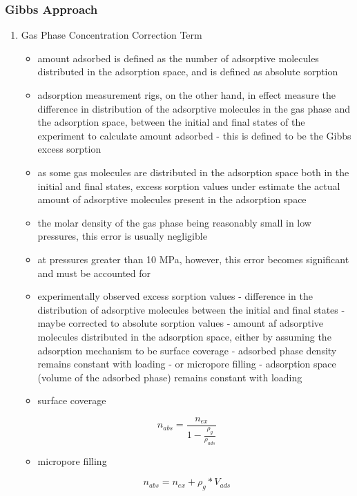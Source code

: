 \documentclass[11pt]{article}
\begin{document}
\subsubsection{Gibbs Approach}
\label{sec:orgd6c236c}
\begin{enumerate}
\item Gas Phase Concentration Correction Term
\label{sec:orgf85845e}
\begin{itemize}
\item amount adsorbed is defined as the number of adsorptive molecules distributed in the adsorption space, and is defined as absolute sorption
\item adsorption measurement rigs, on the other hand, in effect measure the difference in distribution of the adsorptive molecules in the gas phase and the adsorption space, between the initial and final states of the experiment to calculate amount adsorbed - this is defined to be the Gibbs excess sorption \cite{Brandani2017}
\item as some gas molecules are distributed in the adsorption space both in the initial and final states, excess sorption values under estimate the actual amount of adsorptive molecules present in the adsorption space
\item the molar density of the gas phase being reasonably small in low pressures, this error is usually negligible
\item at pressures greater than 10 MPa, however, this error becomes significant and must be accounted for
\item experimentally observed excess sorption values - difference in the distribution of adsorptive molecules between the initial and final states - maybe corrected to absolute sorption values - amount af adsorptive molecules distributed in the adsorption space, either by assuming the adsorption mechanism to be surface coverage - adsorbed phase density remains constant with loading - or micropore filling - adsorption space (volume of the adsorbed phase) remains constant with loading
\item surface coverage
\end{itemize}
\begin{equation}
n_{abs} = \frac{n_{ex}}{1-\frac{\rho_{g}}{\rho_{ads}}}
\end{equation}
\begin{itemize}
\item micropore filling
\end{itemize}
\begin{equation}
n_{abs} = n_{ex} + \rho_g * V_{ads}

\end{equation}
\end{enumerate}
\end{document}
